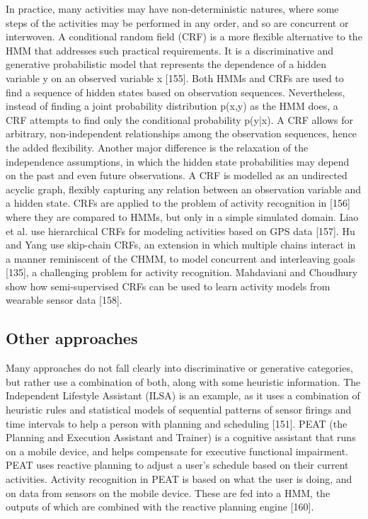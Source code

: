 In practice, many activities may have non-deterministic natures, where some steps of the activities may be performed in any order, and so are concurrent or interwoven. A conditional random field (CRF) is a more flexible alternative to the HMM that addresses such practical requirements. It is a discriminative and generative probabilistic model that represents the dependence of a hidden variable y on an observed variable x [155]. Both HMMs and CRFs are used to find a sequence of hidden states based on observation sequences. Nevertheless, instead of finding a joint probability distribution p(x,y) as the HMM does, a CRF attempts to find only the conditional probability p(y|x). A CRF allows for arbitrary, non-independent relationships among the observation sequences, hence the added flexibility. Another major difference is the relaxation of the independence assumptions, in which the hidden state probabilities may depend on the past and even future observations. A CRF is modelled as an undirected acyclic graph, flexibly capturing any relation between an observation variable and a hidden state. CRFs are applied to the problem of activity recognition in [156] where they are compared to HMMs, but only in a simple simulated domain. Liao et al. use hierarchical CRFs for modeling activities based on GPS data [157]. Hu and Yang use skip-chain CRFs, an extension in which multiple chains interact in a manner reminiscent of the CHMM, to model concurrent and interleaving goals [135], a challenging problem for activity recognition. Mahdaviani and Choudhury show how semi-supervised CRFs can be used to learn activity models from wearable sensor data [158].

\subsection{Other approaches}

Many approaches do not fall clearly into discriminative or generative categories, but rather use a combination of both, along with some heuristic information. The Independent Lifestyle Assistant (ILSA) is an example, as it uses a combination of heuristic rules and statistical models of sequential patterns of sensor firings and time intervals to help a person with planning and scheduling [151]. PEAT (the Planning and Execution Assistant and Trainer) is a cognitive assistant that runs on a mobile device, and helps compensate for executive functional impairment. PEAT uses reactive planning to adjust a user’s schedule based on their current activities. Activity recognition in PEAT is based on what the user is doing, and on data from sensors on the mobile device. These are fed into a HMM, the outputs of which are combined with the reactive planning engine [160].

